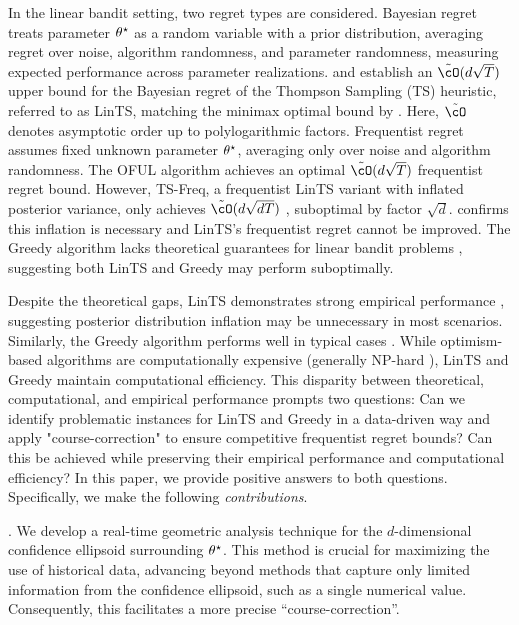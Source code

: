 In the linear bandit setting, two regret types are considered. Bayesian regret treats parameter $\theta^\star$ as a random variable with a prior distribution, averaging regret over noise, algorithm randomness, and parameter randomness, measuring expected performance across parameter realizations. \cite{russo2014learning} and \cite{dong2018information} establish an $\tilde{\cO}(d \sqrt{T})$ upper bound for the  Bayesian regret of the Thompson Sampling (TS) heuristic, referred to as LinTS, matching the minimax optimal bound by \cite{dani2008stochastic}. Here, $\tilde{\cO}$ denotes asymptotic order up to polylogarithmic factors. Frequentist regret assumes fixed unknown parameter $\theta^\star$, averaging only over noise and algorithm randomness. The OFUL algorithm \citep{abbasi2011improved} achieves an optimal $\tilde{\cO}(d\sqrt{T})$ frequentist regret bound. However, TS-Freq, a frequentist LinTS variant with inflated posterior variance, only achieves $\tilde{\cO}(d\sqrt{dT})$ \citep{agrawal2013thompson,abeille2017linear}, suboptimal by factor $\sqrt{d}$. \citet{hamidi2020frequentist} confirms this inflation is necessary and LinTS's frequentist regret cannot be improved. The Greedy algorithm lacks theoretical guarantees for linear bandit problems \citep{lattimore2017end}, suggesting both LinTS and Greedy may perform suboptimally.


Despite the theoretical gaps, LinTS demonstrates strong empirical performance \citep{russo2018tutorial}, suggesting posterior distribution inflation may be unnecessary in most scenarios. Similarly, the Greedy algorithm performs well in typical cases \citep{bietti2021contextual}. While optimism-based algorithms are computationally expensive (generally NP-hard \citep{dani2008stochastic,russo2014learning,agrawal2019recent}), LinTS and Greedy maintain computational efficiency. This disparity between theoretical, computational, and empirical performance prompts two questions: Can we identify problematic instances for LinTS and Greedy in a data-driven way and apply "course-correction" to ensure competitive frequentist regret bounds? Can this be achieved while preserving their empirical performance and computational efficiency?
In this paper, we provide positive answers to both questions. Specifically, we make the following \emph{contributions}.

. We develop a real-time geometric analysis technique for the $d$-dimensional confidence ellipsoid surrounding $\theta^\star$. This method is crucial for maximizing the use of historical data, advancing beyond methods that capture only limited information from the confidence ellipsoid, such as a single numerical value. Consequently, this facilitates a more precise ``course-correction''.

